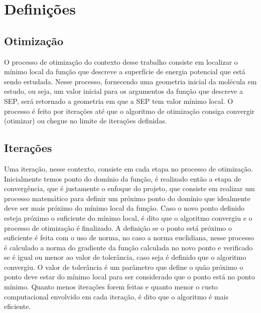 \section{Definições}
\label{sec:definitions}

\subsection{Otimização}

O processo de otimização do contexto desse trabalho consiste em localizar o mínimo local da função que descreve a superfície de energia potencial que está sendo estudada. Nesse processo, fornecendo uma geometria inicial da molécula em estudo, ou seja, um valor inicial para os argumentos da função que descreve a SEP, será retornado a geometria em que a SEP tem valor mínimo local. O processo é feito por iterações até que o algoritmo de otimização consiga convergir (otimizar) ou chegue no limite de iterações definidas.

\subsection{Iterações}

Uma iteração, nesse contexto, consiste em cada etapa no processo de otimização. Inicialmente temos ponto do domínio da função, é realizado então a etapa de convergência, que é justamente o enfoque do projeto, que consiste em realizar um processo matemático para definir um próximo ponto do domínio que idealmente deve ser mais próximo do mínimo local da função. Caso o novo ponto definido esteja próximo o suficiente do mínimo local, é dito que o algoritmo convergiu e o processo de otimização é finalizado. A definição se o ponto está próximo o suficiente é feita com o uso de norma, no caso a norma euclidiana, nesse processo é calculado a norma do gradiente da função calculada no novo ponto e verificado se é igual ou menor ao valor de tolerância, caso seja é definido que o algoritmo convergiu. O valor de tolerância é um parâmetro que define o quão próximo o ponto deve estar do mínimo local para ser considerado que o ponto está no ponto mínimo. Quanto menos iterações forem feitas e quanto menor o custo computacional envolvido em cada iteração, é dito que o algoritmo é mais eficiente.
